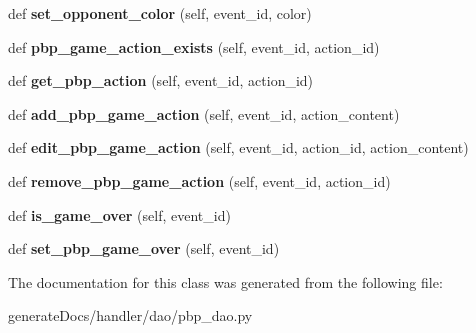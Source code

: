 \begin{DoxyCompactItemize}
def {\bfseries set\+\_\+opponent\+\_\+color} (self, event\+\_\+id, color)
\item 
\mbox{\label{classpbp__dao_1_1_p_b_p_dao_a0069d73a219fabe0090f126977908a93}} 
def {\bfseries pbp\+\_\+game\+\_\+action\+\_\+exists} (self, event\+\_\+id, action\+\_\+id)
\item 
\mbox{\label{classpbp__dao_1_1_p_b_p_dao_a07ed41192b71861825abd589afa3468c}} 
def {\bfseries get\+\_\+pbp\+\_\+action} (self, event\+\_\+id, action\+\_\+id)
\item 
\mbox{\label{classpbp__dao_1_1_p_b_p_dao_a47e93c06ed1fa6cbfbf5855d9a1a39cb}} 
def {\bfseries add\+\_\+pbp\+\_\+game\+\_\+action} (self, event\+\_\+id, action\+\_\+content)
\item 
\mbox{\label{classpbp__dao_1_1_p_b_p_dao_af7d5dea8541dcbc6e628342639348ab0}} 
def {\bfseries edit\+\_\+pbp\+\_\+game\+\_\+action} (self, event\+\_\+id, action\+\_\+id, action\+\_\+content)
\item 
\mbox{\label{classpbp__dao_1_1_p_b_p_dao_ae4ba298a1971c84388ff3841844ccaa5}} 
def {\bfseries remove\+\_\+pbp\+\_\+game\+\_\+action} (self, event\+\_\+id, action\+\_\+id)
\item 
\mbox{\label{classpbp__dao_1_1_p_b_p_dao_aca57263dabe181fb59c3933a983e4ea8}} 
def {\bfseries is\+\_\+game\+\_\+over} (self, event\+\_\+id)
\item 
\mbox{\label{classpbp__dao_1_1_p_b_p_dao_a3ab50080cd36624c6ea0652cb14d24dd}} 
def {\bfseries set\+\_\+pbp\+\_\+game\+\_\+over} (self, event\+\_\+id)
\end{DoxyCompactItemize}


The documentation for this class was generated from the following file\+:\begin{DoxyCompactItemize}
\item 
generate\+Docs/handler/dao/pbp\+\_\+dao.\+py\end{DoxyCompactItemize}
